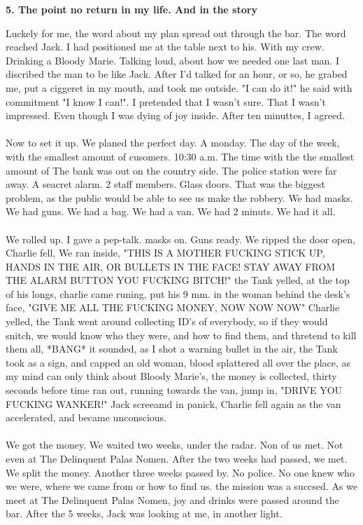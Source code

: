 \documentclass[]{article}
\begin{document}
\begin{center}
	\large\textbf{5. The point no return in my life. \newline And in the story}
\end{center}

Luckely for me, the word about my plan spread out through the bar. The word reached Jack. I had positioned me at the table next to his. With my crew. Drinking a Bloody Marie. Talking loud, about how we needed one last man. I discribed the man to be like Jack. After I'd talked for an hour, or so, he grabed me, put a ciggeret in my mouth, and took me outside. "I can do it!" he said with commitment "I know I can!". I pretended that I wasn't sure. That I wasn't impressed. Even though I was dying of joy inside. After ten minuttes, I agreed.
\\ \\
Now to set it up. We planed the perfect day. A monday. The day of the week, with the smallest amount of cusomers. 10:30 a.m. The time with the the smallest amount of The bank was out on the country side. The police station were far away. A seacret alarm. 2 staff members. Glass doors. That was the biggest problem, as the public would be able to see us make the robbery. We had masks. We had guns. We had a bag. We had a van. We had 2 minuts. We had it all.
\\ \\
We rolled up. I gave a pep-talk. masks on. Guns ready. We ripped the door open, Charlie fell, We ran inside, "THIS IS A MOTHER FUCKING STICK UP, HANDS IN THE AIR, OR BULLETS IN THE FACE! STAY AWAY FROM THE ALARM BUTTON YOU FUCKING BITCH!" the Tank yelled, at the top of his longs, charlie came runing, put his 9 mm. in the woman behind the desk's face, "GIVE ME ALL THE FUCKING MONEY, NOW NOW NOW" Charlie yelled, the Tank went around collecting ID's of everybody, so if they would snitch, we would know who they were, and how to find them, and thretend to kill them all, *BANG* it sounded, as I shot a warning bullet in the air, the Tank took as a sign, and capped an old woman, blood splattered all over the place, as my mind can only think about Bloody Marie's, the money is collected, thirty seconds before time ran out, running towards the van, jump in, "DRIVE YOU FUCKING WANKER!" Jack screeamd in panick, Charlie fell again as the van accelerated, and became unconscious. 
\\ \\
We got the money. We waited two weeks, under the radar. Non of us met. Not even at The Delinquent Palas Nomen. After the two weeks had passed, we met. We split the money. Another three weeks passed by. No police. No one knew who we were, where we came from or how to find us. the mission was a succsed. As we meet at The Delinquent Palas Nomen, joy and drinks were passed around the bar. After the 5 weeks, Jack was looking at me, in another light. 
\end{document}
